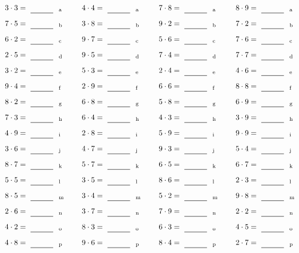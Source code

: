 \documentclass
[
  draft    = true,
  fontsize = 11pt,
  parskip  = half-
]
{scrartcl}
\begin{document}
\par\vfill\par
\begin{align*}
    \pline{3\cdot3}&=\rline{a}
  & \pline{4\cdot4}&=\rline{a}
  & \pline{7\cdot8}&=\rline{a}
  & \pline{8\cdot9}&=\rline{a} \\[1ex]
    \pline{7\cdot5}&=\rline{b}
  & \pline{3\cdot8}&=\rline{b}
  & \pline{9\cdot2}&=\rline{b}
  & \pline{7\cdot2}&=\rline{b} \\[1ex]
    \pline{6\cdot2}&=\rline{c}
  & \pline{9\cdot7}&=\rline{c}
  & \pline{5\cdot6}&=\rline{c}
  & \pline{7\cdot6}&=\rline{c} \\[1ex]
    \pline{2\cdot5}&=\rline{d}
  & \pline{9\cdot5}&=\rline{d}
  & \pline{7\cdot4}&=\rline{d}
  & \pline{7\cdot7}&=\rline{d} \\[1ex]
    \pline{3\cdot2}&=\rline{e}
  & \pline{5\cdot3}&=\rline{e}
  & \pline{2\cdot4}&=\rline{e}
  & \pline{4\cdot6}&=\rline{e} \\[1ex]
    \pline{9\cdot4}&=\rline{f}
  & \pline{2\cdot9}&=\rline{f}
  & \pline{6\cdot6}&=\rline{f}
  & \pline{8\cdot8}&=\rline{f} \\[1ex]
    \pline{8\cdot2}&=\rline{g}
  & \pline{6\cdot8}&=\rline{g}
  & \pline{5\cdot8}&=\rline{g}
  & \pline{6\cdot9}&=\rline{g} \\[1ex]
    \pline{7\cdot3}&=\rline{h}
  & \pline{6\cdot4}&=\rline{h}
  & \pline{4\cdot3}&=\rline{h}
  & \pline{3\cdot9}&=\rline{h} \\[1ex]
    \pline{4\cdot9}&=\rline{i}
  & \pline{2\cdot8}&=\rline{i}
  & \pline{5\cdot9}&=\rline{i}
  & \pline{9\cdot9}&=\rline{i} \\[1ex]
    \pline{3\cdot6}&=\rline{j}
  & \pline{4\cdot7}&=\rline{j}
  & \pline{9\cdot3}&=\rline{j}
  & \pline{5\cdot4}&=\rline{j} \\[1ex]
    \pline{8\cdot7}&=\rline{k}
  & \pline{5\cdot7}&=\rline{k}
  & \pline{6\cdot5}&=\rline{k}
  & \pline{6\cdot7}&=\rline{k} \\[1ex]
    \pline{5\cdot5}&=\rline{l}
  & \pline{3\cdot5}&=\rline{l}
  & \pline{8\cdot6}&=\rline{l}
  & \pline{2\cdot3}&=\rline{l} \\[1ex]
    \pline{8\cdot5}&=\rline{m}
  & \pline{3\cdot4}&=\rline{m}
  & \pline{5\cdot2}&=\rline{m}
  & \pline{9\cdot8}&=\rline{m} \\[1ex]
    \pline{2\cdot6}&=\rline{n}
  & \pline{3\cdot7}&=\rline{n}
  & \pline{7\cdot9}&=\rline{n}
  & \pline{2\cdot2}&=\rline{n} \\[1ex]
    \pline{4\cdot2}&=\rline{o}
  & \pline{8\cdot3}&=\rline{o}
  & \pline{6\cdot3}&=\rline{o}
  & \pline{4\cdot5}&=\rline{o} \\[1ex]
    \pline{4\cdot8}&=\rline{p}
  & \pline{9\cdot6}&=\rline{p}
  & \pline{8\cdot4}&=\rline{p}
  & \pline{2\cdot7}&=\rline{p}
\end{align*}
\end{document}
